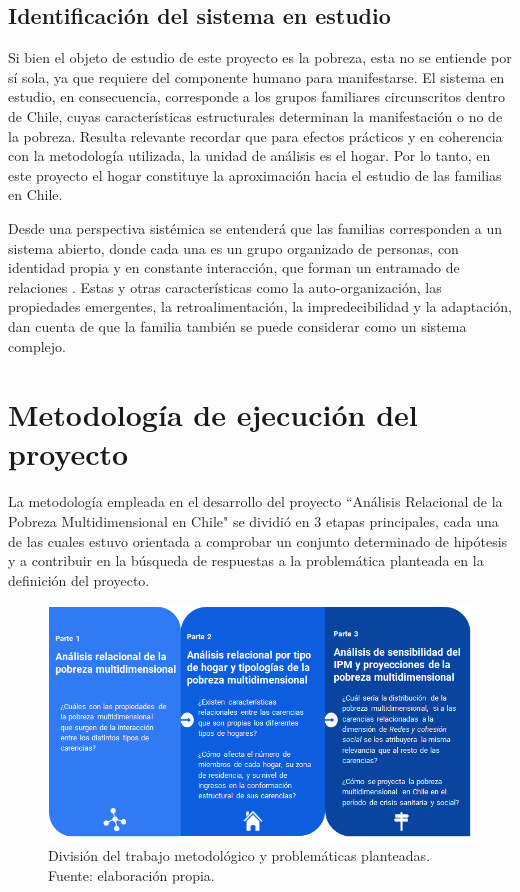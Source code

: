 \documentclass[12pt,letterpaper,spanish]{article}
\begin{document}
\subsection{Identificación del sistema en estudio}
Si bien el objeto de estudio de este proyecto es la pobreza, esta no se entiende por sí sola, ya que requiere del componente humano para manifestarse. El sistema en estudio, en consecuencia, corresponde a los grupos familiares circunscritos dentro de Chile, cuyas características estructurales determinan la manifestación o no de la pobreza. Resulta relevante recordar que para efectos prácticos y en coherencia con la metodología utilizada, la unidad de análisis es el hogar. Por lo tanto, en este proyecto el hogar constituye la aproximación hacia el estudio de las familias en Chile.

Desde una perspectiva sistémica se entenderá que las familias corresponden a un sistema abierto, donde cada una es un grupo organizado de personas, con identidad propia y en constante interacción, que forman un entramado de relaciones \cite{I.Espinal.2006ElFamilia}. Estas y otras características como la auto-organización, las propiedades emergentes, la retroalimentación, la impredecibilidad y la adaptación, dan cuenta de que la familia también se puede considerar como un sistema complejo.



\newpage
\section{Metodología de ejecución del proyecto} %

La metodología empleada en el desarrollo del proyecto ``Análisis Relacional de la Pobreza Multidimensional en Chile"  se dividió en 3 etapas principales, cada una de las cuales estuvo orientada a comprobar un conjunto determinado de hipótesis y a contribuir en la búsqueda de respuestas a la problemática planteada en la definición del proyecto.

\begin{figure}[H]
    \centering
    \includegraphics[width=\textwidth]{Max/intro_metodologia.png}
    \caption{División del trabajo metodológico y problemáticas planteadas. Fuente: elaboración propia.}
    \label{intro_metodologia}
\end{figure}
\end{document}
